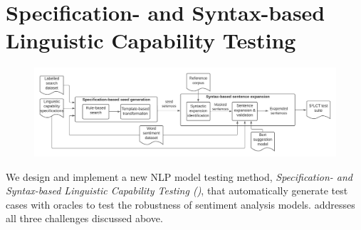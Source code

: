 \section{Specification- and Syntax-based Linguistic Capability Testing}
\label{sec:approach}

\begin{figure}[t]
  \centering
  \includegraphics[width=\linewidth]{figs/overview.pdf}
  \caption{\OverviewFigCaption}
\end{figure}

  
We design and implement a new NLP model testing method,
\emph{Specification- and Syntax-based Linguistic Capability Testing
  (\tool{})}, that automatically generate test cases with oracles to
test the robustness of sentiment analysis models. \tool{} addresses
all three challenges discussed above.




